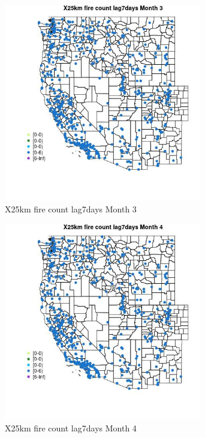 \begin{figure} 
\centering  
\includegraphics[width=0.77\textwidth]{Code_Outputs/Report_ML_input_PM25_Step4_part_e_de_duplicated_aves_compiled_2019-05-14wNAs_MapObsMo3X25km_fire_count_lag7days.jpg} 
\caption{\label{fig:Report_ML_input_PM25_Step4_part_e_de_duplicated_aves_compiled_2019-05-14wNAsMapObsMo3X25km_fire_count_lag7days}X25km fire count lag7days Month 3} 
\end{figure} 
 

\begin{figure} 
\centering  
\includegraphics[width=0.77\textwidth]{Code_Outputs/Report_ML_input_PM25_Step4_part_e_de_duplicated_aves_compiled_2019-05-14wNAs_MapObsMo4X25km_fire_count_lag7days.jpg} 
\caption{\label{fig:Report_ML_input_PM25_Step4_part_e_de_duplicated_aves_compiled_2019-05-14wNAsMapObsMo4X25km_fire_count_lag7days}X25km fire count lag7days Month 4} 
\end{figure} 
 

